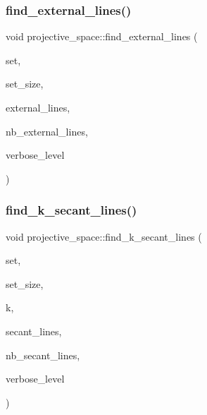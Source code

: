 \mbox{\label{classprojective__space_a2adc12b7ccc61af67d59406a8cb0cb31}} 
\subsubsection{\texorpdfstring{find\+\_\+external\+\_\+lines()}{find\_external\_lines()}}
{\footnotesize\ttfamily void projective\+\_\+space\+::find\+\_\+external\+\_\+lines (\begin{DoxyParamCaption}\item[{\mbox{\hyperlink{galois_8h_a09fddde158a3a20bd2dcadb609de11dc}{I\+NT}} $\ast$}]{set,  }\item[{\mbox{\hyperlink{galois_8h_a09fddde158a3a20bd2dcadb609de11dc}{I\+NT}}}]{set\+\_\+size,  }\item[{\mbox{\hyperlink{galois_8h_a09fddde158a3a20bd2dcadb609de11dc}{I\+NT}} $\ast$}]{external\+\_\+lines,  }\item[{\mbox{\hyperlink{galois_8h_a09fddde158a3a20bd2dcadb609de11dc}{I\+NT}} \&}]{nb\+\_\+external\+\_\+lines,  }\item[{\mbox{\hyperlink{galois_8h_a09fddde158a3a20bd2dcadb609de11dc}{I\+NT}}}]{verbose\+\_\+level }\end{DoxyParamCaption})}

\mbox{\label{classprojective__space_afe69446156086fa463ffa93676f00f91}} 
\subsubsection{\texorpdfstring{find\+\_\+k\+\_\+secant\+\_\+lines()}{find\_k\_secant\_lines()}}
{\footnotesize\ttfamily void projective\+\_\+space\+::find\+\_\+k\+\_\+secant\+\_\+lines (\begin{DoxyParamCaption}\item[{\mbox{\hyperlink{galois_8h_a09fddde158a3a20bd2dcadb609de11dc}{I\+NT}} $\ast$}]{set,  }\item[{\mbox{\hyperlink{galois_8h_a09fddde158a3a20bd2dcadb609de11dc}{I\+NT}}}]{set\+\_\+size,  }\item[{\mbox{\hyperlink{galois_8h_a09fddde158a3a20bd2dcadb609de11dc}{I\+NT}}}]{k,  }\item[{\mbox{\hyperlink{galois_8h_a09fddde158a3a20bd2dcadb609de11dc}{I\+NT}} $\ast$}]{secant\+\_\+lines,  }\item[{\mbox{\hyperlink{galois_8h_a09fddde158a3a20bd2dcadb609de11dc}{I\+NT}} \&}]{nb\+\_\+secant\+\_\+lines,  }\item[{\mbox{\hyperlink{galois_8h_a09fddde158a3a20bd2dcadb609de11dc}{I\+NT}}}]{verbose\+\_\+level }\end{DoxyParamCaption})}

